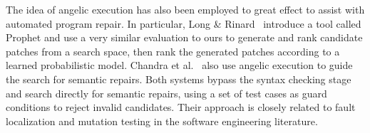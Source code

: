 The idea of angelic execution has also been employed to great effect to assist with automated program repair. In particular, Long \& Rinard~\cite{long2016automatic} introduce a tool called Prophet and use a very similar evaluation to ours to generate and rank candidate patches from a search space, then rank the generated patches according to a learned probabilistic model. Chandra et al.~\cite{chandra2011angelic} also use angelic execution to guide the search for semantic repairs. Both systems bypass the syntax checking stage and search directly for semantic repairs, using a set of test cases as guard conditions to reject invalid candidates. Their approach is closely related to fault localization and mutation testing in the software engineering literature.


\clearpage